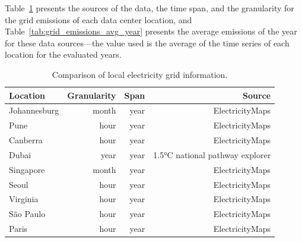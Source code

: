 Table~\ref{tab:grid_emissions_hist} presents the sources of the data, the time span, and the granularity for the grid emissions of each data center location, and Table~\ref{tab:grid_emissions_avg_year} presents the average  emissions of the year for these data sources---the value used is the average of the time series of each location for the evaluated years.

\begin{table}[h]  
\caption{Comparison of local electricity grid  information. }\label{tab:grid_emissions_hist} \centering  
  \begin{tabular}{|l|r|r|r|}
    \hline
    
  \textbf{Location} &   \textbf{Granularity} & \textbf{Span} & \textbf{Source} \\
  \hline
  Johannesburg & month & year & ElectricityMaps  \\
  \hline
  Pune  & hour & year & ElectricityMaps  \\
  \hline
  Canberra  & hour &  year & ElectricityMaps \\
  \hline
  Dubai    & year & year & 1.5°C national pathway explorer  \\                       
  \hline
  Singapore & month & year & ElectricityMaps \\
  \hline     
  Seoul     & hour & year & ElectricityMaps \\
  \hline
  Virginia  &  hour & year & ElectricityMaps \\
  \hline
  São Paulo & hour & year  & ElectricityMaps \\
  \hline 
  Paris     & hour & year  & ElectricityMaps  \\
  \hline
\end{tabular}  
\end{table}


